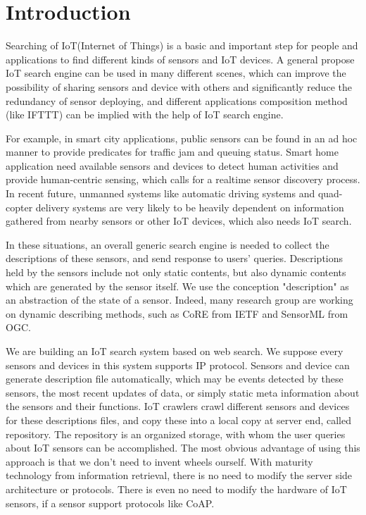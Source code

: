 \documentclass[conference]{IEEEtran}
\begin{document}
\IEEEpeerreviewmaketitle

\section{Introduction}
Searching of IoT(Internet of Things) is a basic and important step for people and applications to find different kinds of sensors and IoT devices. 
A general propose IoT search engine can be used in many different scenes, which can improve the possibility of sharing sensors and device with others and significantly reduce the redundancy of sensor deploying, and different applications composition method (like IFTTT\cite{ifttt}) can be implied with the help of IoT search engine.

For example, in smart city applications, public sensors can be found in an ad hoc manner to provide predicates for traffic jam and queuing status. 
Smart home application need available sensors and devices to detect human activities and provide human-centric sensing, which calls for a realtime sensor discovery process. In recent future, unmanned systems like automatic driving systems and quad-copter delivery systems are very likely to be heavily dependent on information gathered from nearby sensors or other IoT devices, which also needs IoT search. 

In these situations, an overall generic search engine is needed to collect the descriptions of these sensors, and send response to users' queries. Descriptions held by the sensors include not only static contents, but also dynamic contents which are generated by the sensor itself. We use the conception "description" as an abstraction of the state of a sensor. Indeed, many research group are working on dynamic describing methods, such as CoRE\cite{CoREWorkingGroup2012} from IETF and SensorML\cite{botts2007opengis} from OGC.


We are building an IoT search system based on web search. We suppose every sensors and devices in this system supports IP protocol. Sensors and device can generate description file automatically, which may be events detected by these sensors, the most recent updates of data, or simply static meta information about the sensors and their functions. 
IoT crawlers crawl different sensors and devices for these descriptions files, and copy these into a local copy at server end, called repository. The repository is an organized storage, with whom the user queries about IoT sensors can be accomplished.
The most obvious advantage of using this approach is that we don't need to invent wheels ourself. With maturity technology from information retrieval, there is no need to modify the server side architecture or protocols. There is even no need to modify the hardware of IoT sensors, if a sensor support protocols like CoAP.
\end{document}
